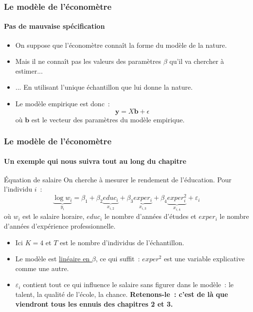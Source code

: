 \documentclass[10pt]{beamer}
\begin{document}
\begin{frame}
  \frametitle{Le modèle de l'économètre}
  \framesubtitle{Pas de mauvaise spécification}

  \begin{itemize}

  \item On suppose que l'économètre connaît la forme du modèle de la nature.\newline

    \bigskip

  \item Mais il ne connaît pas les valeurs des paramètres $\beta$ qu'il va chercher à estimer...\newline

    \bigskip

  \item ... En utilisant l'unique échantillon que lui donne la nature.\newline

    \bigskip

  \item Le modèle empirique est donc~:
    \[
      \mathbf y = X\mathbf b + \epsilon
    \]
    où $\mathbf b$ est le vecteur des paramètres du modèle empirique.
  \end{itemize}

\end{frame}


\begin{frame}
  \frametitle{Le modèle de l'économètre}
  \framesubtitle{Un exemple qui nous suivra tout au long du chapitre}

  \begin{exemple}{Équation de salaire}
    On cherche à mesurer le rendement de l'éducation. Pour l'individu $i$~:
    \[
      \underbrace{\log w_i}_{y_i} = \beta_1 + \beta_2 \underbrace{educ_i}_{x_{i,2}}
      + \beta_3 \underbrace{exper_i}_{x_{i,3}} + \beta_4 \underbrace{exper_i^2}_{x_{i,4}}
      + \varepsilon_i
    \]
    où $w_i$ est le salaire horaire, $educ_i$ le nombre d'années d'études
    et $exper_i$ le nombre d'années d'expérience professionnelle.
  \end{exemple}

  \bigskip

  \begin{itemize}

  \item Ici $K=4$ et $T$ est le nombre d'individus de l'échantillon.\newline

  \item Le modèle est \underline{linéaire en $\beta$}, ce qui suffit~: $exper^2$ est une
    variable explicative comme une autre.\newline

  \item $\varepsilon_i$ contient tout ce qui influence le salaire sans figurer dans le
    modèle~: le talent, la qualité de l'école, la chance. \textbf{Retenons-le~: c'est de
    là que viendront tous les ennuis des chapitres 2 et 3.}

  \end{itemize}

\end{frame}
\end{document}
